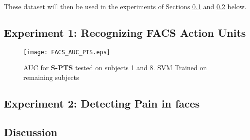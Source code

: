 \documentclass[Main]{subfiles}
\begin{document}
			These dataset will then be used in the experiments of Sections \ref{sub:experiment_1_recognizing_facs_action_units} and \ref{sub:experiment_2_detecting_pain_in_faces} below.
			
		

	\subsection{Experiment 1: Recognizing FACS Action Units} %
		\label{sub:experiment_1_recognizing_facs_action_units}

		\begin{figure}[H]
			\begin{center}
				\texttt{[image: FACS\_AUC\_PTS.eps]}
			\end{center}
			\caption{
				AUC for \textbf{S-PTS} tested on subjects 1 and 8.
				SVM Trained on remaining subjects
				}
			\label{fig:spts_auc}
		\end{figure}
		


	\subsection{Experiment 2: Detecting Pain in faces} %
		\label{sub:experiment_2_detecting_pain_in_faces}
		


	\subsection{Discussion} %
		\label{sub:discussion}
		

\end{document}
